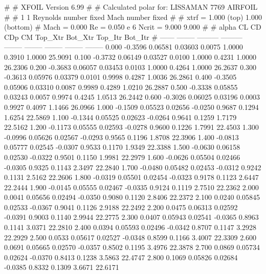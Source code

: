 #  
#       XFOIL         Version 6.99
#  
# Calculated polar for: LISSAMAN 7769 AIRFOIL                           
#  
# 1 1 Reynolds number fixed          Mach number fixed         
#  
# xtrf =   1.000 (top)        1.000 (bottom)  
# Mach =   0.000     Re =     0.050 e 6     Ncrit =   9.000  9.000
#  
#   alpha    CL        CD       CDp       CM     Top_Xtr  Bot_Xtr  Top_Itr  Bot_Itr
#  ------ -------- --------- --------- -------- -------- -------- -------- --------
   0.000  -0.3596   0.06581   0.03603   0.0075   1.0000   0.3910   1.0000  25.9091
   0.100  -0.3732   0.06149   0.03527   0.0100   1.0000   0.4231   1.0000  26.2306
   0.200  -0.3683   0.06057   0.03453   0.0103   1.0000   0.4264   1.0000  26.2637
   0.300  -0.3613   0.05976   0.03379   0.0101   0.9998   0.4287   1.0036  26.2861
   0.400  -0.3505   0.05906   0.03310   0.0087   0.9989   0.4289   1.0210  26.2887
   0.500  -0.3338   0.05855   0.03243   0.0057   0.9974   0.4245   1.0513  26.2442
   0.600  -0.3026   0.06025   0.03196   0.0003   0.9927   0.4097   1.1466  26.0966
   1.000  -0.1509   0.05523   0.02656  -0.0250   0.9687   0.1294   1.6254  22.5869
   1.100  -0.1344   0.05525   0.02623  -0.0264   0.9641   0.1259   1.7179  22.5162
   1.200  -0.1173   0.05555   0.02593  -0.0278   0.9600   0.1226   1.7991  22.4503
   1.300  -0.0996   0.05626   0.02567  -0.0293   0.9565   0.1196   1.8708  22.3906
   1.400  -0.0813   0.05777   0.02545  -0.0307   0.9533   0.1170   1.9349  22.3388
   1.500  -0.0630   0.06158   0.02530  -0.0322   0.9501   0.1150   1.9981  22.2979
   1.600  -0.0626   0.05504   0.02466  -0.0305   0.9325   0.1143   2.3497  22.2840
   1.700  -0.0480   0.05482   0.02453  -0.0312   0.9242   0.1131   2.5162  22.2606
   1.800  -0.0319   0.05501   0.02454  -0.0323   0.9178   0.1123   2.6447  22.2444
   1.900  -0.0145   0.05555   0.02467  -0.0335   0.9124   0.1119   2.7510  22.2362
   2.000   0.0041   0.05656   0.02494  -0.0350   0.9080   0.1120   2.8406  22.2372
   2.100   0.0240   0.05845   0.02533  -0.0367   0.9041   0.1126   2.9188  22.2492
   2.200   0.0475   0.06313   0.02592  -0.0391   0.9003   0.1140   2.9944  22.2775
   2.300   0.0407   0.05943   0.02541  -0.0365   0.8963   0.1141   3.0371  22.2810
   2.400   0.0394   0.05593   0.02496  -0.0342   0.8707   0.1147   3.2928  22.2929
   2.500   0.0533   0.05617   0.02527  -0.0348   0.8599   0.1166   3.4007  22.3309
   2.600   0.0691   0.05665   0.02570  -0.0357   0.8502   0.1195   3.4976  22.3878
   2.700   0.0869   0.05734   0.02624  -0.0370   0.8413   0.1238   3.5863  22.4747
   2.800   0.1069   0.05826   0.02684  -0.0385   0.8332   0.1309   3.6671  22.6171
